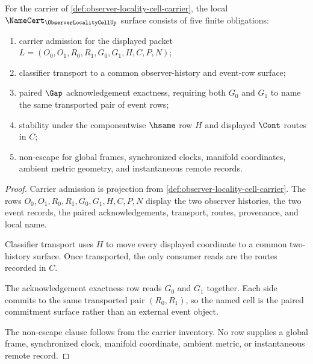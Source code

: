 \begin{theorem}
\label{thm:observer-locality-cell-namecert-obligations}
For the carrier of \autoref{def:observer-locality-cell-carrier}, the local $\NameCert_{\ObserverLocalityCellUp}$ surface consists of five finite obligations:
\begin{enumerate}
\item carrier admission for the displayed packet $L=(O_0,O_1,R_0,R_1,G_0,G_1,H,C,P,N)$;
\item classifier transport to a common observer-history and event-row surface;
\item paired $\Gap$ acknowledgement exactness, requiring both $G_0$ and $G_1$ to name the same transported pair of event rows;
\item stability under the componentwise $\hsame$ row $H$ and displayed $\Cont$ routes in $C$;
\item non-escape for global frames, synchronized clocks, manifold coordinates, ambient metric geometry, and instantaneous remote records.
\end{enumerate}
\end{theorem}
\begin{proof}
Carrier admission is projection from \autoref{def:observer-locality-cell-carrier}. The rows $O_0,O_1,R_0,R_1,G_0,G_1,H,C,P,N$ display the two observer histories, the two event records, the paired acknowledgements, transport, routes, provenance, and local name.

Classifier transport uses $H$ to move every displayed coordinate to a common two-history surface. Once transported, the only consumer reads are the routes recorded in $C$.

The acknowledgement exactness row reads $G_0$ and $G_1$ together. Each side commits to the same transported pair $(R_0,R_1)$, so the named cell is the paired commitment surface rather than an external event object.

The non-escape clause follows from the carrier inventory. No row supplies a global frame, synchronized clock, manifold coordinate, ambient metric, or instantaneous remote record.
\end{proof}

